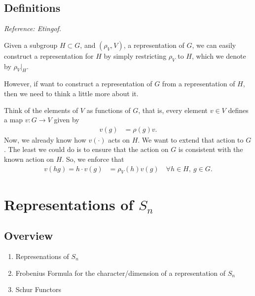 \section{Definitions}

\emph{Reference: Etingof.}

Given a subgroup $H\subset G$, and $(\rho_V, V)$, a representation of $G$, we can easily construct a representation for $H$ by simply restricting $\rho_V$ to $H$, which we denote by $\rho_V|_H$.

However, if want to construct a representation of $G$ from a representation of $H$, then we need to think a little more about it. 

Think of the elements of $V$ as functions of $G$, that is, every element $v\in V$ defines a map $v: G\to V$ given by
\begin{align}
    v(g) &= \rho(g) v.
\end{align}
Now, we already know how $v(\cdot)$ acts on $H$. We want to extend that action to $G$. The least we could do is to ensure that the action on $G$ is consistent with the known action on $H$. So, we enforce that
\begin{align}
    v(hg) = h\cdot v(g) &= \rho_V(h) v(g)\quad \forall h\in H,\ g\in G.
\end{align}

\begin{insight}
\end{insight}

\chapter{Representations of \texorpdfstring{$S_n$}{Sn}}
\label{cha:representations_of_s_n}



\section{Overview}

\begin{enumerate}
    \makethislistcompact
    \item Represenations of $S_n$
    \item Frobenius Formula for the character/dimension of a representation of $S_n$
    \item Schur Functors
\end{enumerate}

